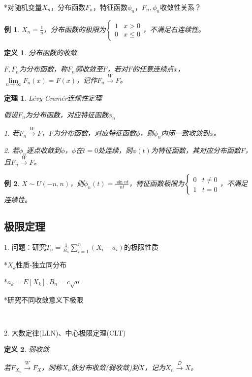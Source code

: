 \documentclass[a4paper,UTF8,fontset=windows]{ctexart}
\newtheorem{thm}{定理}[section]
\newtheorem{exmp}{例}[section]
\newtheorem{defi}{定义}[section]
\newcommand{\con}[1]{\stackrel{#1}{\longrightarrow}}
\begin{document}
*对随机变量$X_n$，分布函数$F_n$，特征函数$\phi_n$，$F_n,\phi_n$收敛性关系？

\begin{exmp}
$X_n=\frac{1}{n}$，分布函数的极限为$\begin{cases}1&x>0\\0&x\le0\end{cases}$，不满足右连续性。
\end{exmp}

\begin{defi} 分布函数的收敛

$F,F_n$为分布函数，称$F_n$\emph{弱收敛}至$F$，若对$F$的任意连续点$x$，$\lim\limits_{n\to\infty}F_n(x)=F(x)$，记作$F_n\con{W}F$。
\end{defi}

\begin{thm} L\'evy-Cram\'er连续性定理

假设$F_n$为分布函数，对应特征函数$\phi_n$

1. 若$F_n\stackrel{W}{\to}F$，$F$为分布函数，对应特征函数$\phi$，则$\phi_n$内闭一致收敛到$\phi$。

2. 若$\phi_n$逐点收敛到$\phi$，$\phi$在$t=0$处连续，则$\phi(t)$为特征函数，其对应分布函数$F$，且$F_n\con{W}F$。
\end{thm}

\begin{exmp}
$X\sim U(-n,n)$，则$\phi_n(t)=\frac{\sin{nt}}{nt}$，特征函数极限为$\begin{cases}0&t\ne0\\1&t=0\end{cases}$，不满足连续性。
\end{exmp}

\subsection{极限定理}
1. 问题：研究$T_n=\frac{1}{B_n}\sum_{i=1}^n(X_i-a_i)$的极限性质

*$X_k$性质-独立同分布

*$a_k=E[X_k],B_n=c\sqrt{n}$

*研究不同收敛意义下极限

~

2. 大数定律(LLN)、中心极限定理(CLT)

\begin{defi} 弱收敛

若$F_{X_n}\con{W}F_X$，则称$X_n$\emph{依分布收敛}(弱收敛)到$X$，记为$X_n\con{D}X$。
\end{defi}
\end{document}
